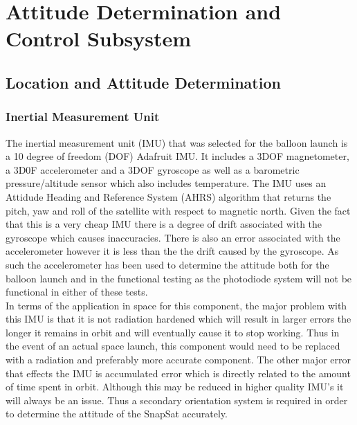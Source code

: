 \section{Attitude Determination and Control Subsystem}
\subsection{Location and Attitude Determination} 
\subsubsection{Inertial Measurement Unit}
The inertial measurement unit (IMU) that was selected for the balloon launch is a 10 degree of freedom (DOF) Adafruit IMU.  It includes a 3DOF magnetometer, a 3D0F accelerometer and a 3DOF gyroscope as well as a barometric pressure/altitude sensor which also includes temperature.  The IMU uses an Attidude Heading and Reference System (AHRS) algorithm that returns the pitch, yaw and roll of the satellite with respect to magnetic north.  Given the fact that this is a very cheap IMU there is a degree of drift associated with the gyroscope which causes inaccuracies.  There is also an error associated with the accelerometer however it is less than the the drift caused by the gyroscope. As such the accelerometer has been used to determine the attitude both for the balloon launch and in the functional testing as the photodiode system will not be functional in either of these tests.\\
In terms of the application in space for this component, the major problem with this IMU is that it is not radiation hardened which will result in larger errors the longer it remains in orbit and will eventually cause it to stop working.  Thus in the event of an actual space launch, this component would need to be replaced with a radiation and preferably more accurate component.  The other major error that effects the IMU is accumulated error which is directly related to the amount of time spent in orbit.  Although this may be reduced in higher quality IMU's it will always be an issue.  Thus a secondary orientation system is required in order to determine the attitude of the SnapSat accurately.
